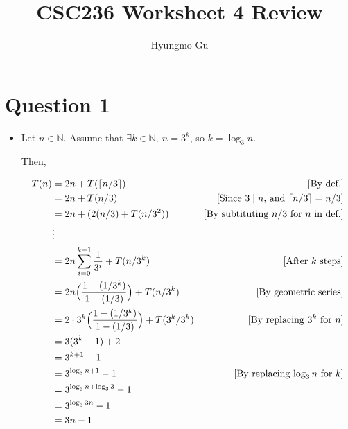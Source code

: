 \documentclass[12pt]{article}
\begin{document}
\title{CSC236 Worksheet 4 Review}
\author{Hyungmo Gu}
\maketitle

\section*{Question 1}
\begin{itemize}
    \item

    Let $n \in \mathbb{N}$. Assume that $\exists k \in \mathbb{N},\:n = 3^k$, so
    $k = \log_3 n$.

    \bigskip

    Then,

    \bigskip

    \begin{align}
        T(n) &= 2n + T(\lceil n/3 \rceil) & [\text{By def.}]\\
        &= 2n + T(n/3) & [\text{Since $3 \mid n$, and $\lceil n/3 \rceil = n/3$}]\\
        &= 2n + (2(n/3) + T(n/3^2)) & [\text{By subtituting $n/3$ for $n$ in def.}]\\
        &\vdots\\
        &=2n\sum\limits_{i=0}^{k-1} \frac{1}{3^i} + T(n/3^k) & [\text{After $k$ steps}]\\
        &=2n \Bigl( \frac{1 - (1/3^k)}{1 - (1/3)} \Bigr) + T(n/3^k) & [\text{By geometric series}]\\
        &=2 \cdot 3^k \Bigl( \frac{1 - (1/3^k)}{1 - (1/3)}  \Bigr) + T(3^k/3^k) & [\text{By replacing $3^k$ for $n$}]\\
        &=3(3^k - 1) + 2\\
        &=3^{k+1} - 1\\
        &=3^{\log_3 n + 1} - 1 & [\text{By replacing $\log_3 n$ for $k$}]\\
        &=3^{\log_3 n + \log_3 3} - 1\\
        &=3^{\log_3 3n} - 1\\
        &=3n - 1
    \end{align}






\end{itemize}
\end{document}
